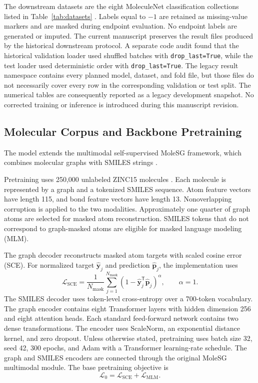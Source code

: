 \documentclass[journal=jcisd8,manuscript=article]{achemso}
\begin{document}
The downstream datasets are the eight MoleculeNet classification collections
listed in Table~\ref{tab:datasets} \cite{Wu2018}. Labels equal to \(-1\) are
retained as missing-value markers and are masked during endpoint evaluation.
No endpoint labels are generated or imputed. The current manuscript preserves
the result files produced by the historical downstream protocol. A separate
code audit found that the historical validation loader used shuffled batches
with \texttt{drop\_last=True}, while the test loader used deterministic order
with \texttt{drop\_last=True}. The legacy result namespace contains every
planned model, dataset, and fold file, but those files do not necessarily cover
every row in the corresponding validation or test split. The numerical tables
are consequently reported as a legacy development snapshot. No corrected
training or inference is introduced during this manuscript revision.

\subsection{Molecular Corpus and Backbone Pretraining}

The model extends the multimodal self-supervised MoleSG framework, which combines molecular graphs with SMILES strings \cite{Shen2024MoleSG}.

Pretraining uses 250,000 unlabeled ZINC15 molecules \cite{Sterling2015ZINC}. Each molecule is represented by a graph and a tokenized SMILES sequence. Atom feature vectors have length 115, and bond feature vectors have length 13. Nonoverlapping corruption is applied to the two modalities. Approximately one quarter of graph atoms are selected for masked atom reconstruction. SMILES tokens that do not correspond to graph-masked atoms are eligible for masked language modeling (MLM).

The graph decoder reconstructs masked atom targets with scaled cosine error (SCE). For normalized target \(\widehat{\mathbf y}_j\) and prediction \(\widehat{\mathbf p}_j\), the implementation uses
\begin{equation}
\mathcal{L}_{\mathrm{SCE}}
=
\frac{1}{N_{\mathrm{mask}}}
\sum_{j=1}^{N_{\mathrm{mask}}}
\left(
1-\widehat{\mathbf y}_j^{\mathsf T}\widehat{\mathbf p}_j
\right)^{\alpha},
\qquad
\alpha=1.
\end{equation}
The SMILES decoder uses token-level cross-entropy over a 700-token vocabulary. The graph encoder contains eight Transformer layers with hidden dimension 256 and eight attention heads. Each standard feed-forward network contains two dense transformations. The encoder uses ScaleNorm, an exponential distance kernel, and zero dropout. Unless otherwise stated, pretraining uses batch size 32, seed 42, 300 epochs, and Adam with a Transformer learning-rate schedule. The graph and SMILES encoders are connected through the original MoleSG multimodal module. The base pretraining objective is
\begin{equation}
\mathcal{L}_0
=
\mathcal{L}_{\mathrm{SCE}}
+
\mathcal{L}_{\mathrm{MLM}}.
\end{equation}
\end{document}
